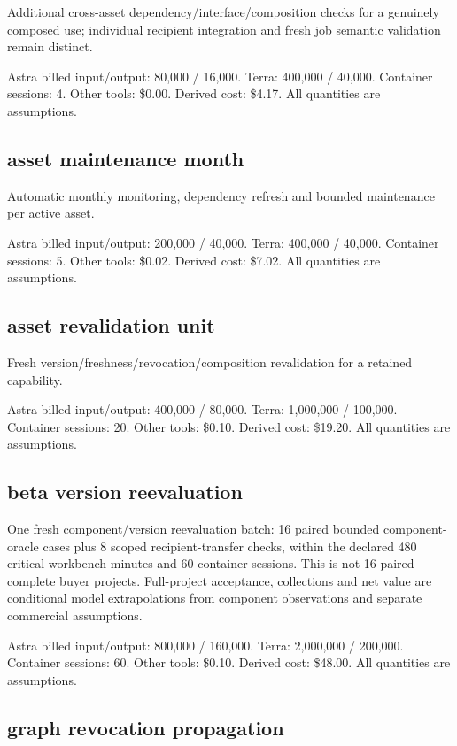 \documentclass[10pt]{article}
\newcommand{\usd}[1]{\$#1}
\begin{document}
Additional cross-asset dependency/interface/composition checks for a genuinely composed use; individual recipient integration and fresh job semantic validation remain distinct.

Astra billed input/output: 80,000 / 16,000. Terra: 400,000 / 40,000. Container sessions: 4. Other tools: \usd{0.00}. Derived cost: \usd{4.17}. All quantities are assumptions.

\subsection*{asset maintenance month}

Automatic monthly monitoring, dependency refresh and bounded maintenance per active asset.

Astra billed input/output: 200,000 / 40,000. Terra: 400,000 / 40,000. Container sessions: 5. Other tools: \usd{0.02}. Derived cost: \usd{7.02}. All quantities are assumptions.

\subsection*{asset revalidation unit}

Fresh version/freshness/revocation/composition revalidation for a retained capability.

Astra billed input/output: 400,000 / 80,000. Terra: 1,000,000 / 100,000. Container sessions: 20. Other tools: \usd{0.10}. Derived cost: \usd{19.20}. All quantities are assumptions.

\subsection*{beta version reevaluation}

One fresh component/version reevaluation batch: 16 paired bounded component-oracle cases plus 8 scoped recipient-transfer checks, within the declared 480 critical-workbench minutes and 60 container sessions. This is not 16 paired complete buyer projects. Full-project acceptance, collections and net value are conditional model extrapolations from component observations and separate commercial assumptions.

Astra billed input/output: 800,000 / 160,000. Terra: 2,000,000 / 200,000. Container sessions: 60. Other tools: \usd{0.10}. Derived cost: \usd{48.00}. All quantities are assumptions.

\subsection*{graph revocation propagation}
\end{document}
